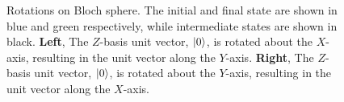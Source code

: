 {\begin{figure}
    \begin{center}
        \qquad
    \end{center}
    \caption[Rotations on Bloch sphere]{
        Rotations on Bloch sphere. 
        The initial and final state are shown in blue and green respectively, while intermediate states are shown in black. 
        \textbf{Left}, The $Z$-basis unit vector, $\ket{0}$, is rotated about the $X$-axis, resulting in the unit vector along the $Y$-axis. 
        \textbf{Right}, The $Z$-basis unit vector, $\ket{0}$, is rotated about the $Y$-axis, resulting in the unit vector along the $X$-axis. 
    }
    \label{fig:bloch_rotations}
\end{figure}
\par 

}
